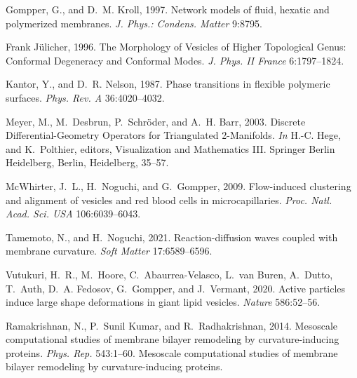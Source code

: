 \documentclass[twocolumn]{biophys-new}
\begin{document}
\begin{thebibliography}{52}
Gompper, G., and D.~M. Kroll, 1997.
\newblock Network models of fluid, hexatic and polymerized membranes.
\newblock \emph{J. Phys.: Condens. Matter} 9:8795.

{Frank J\"ulicher}, 1996.
\newblock The Morphology of Vesicles of Higher Topological Genus: Conformal
  Degeneracy and Conformal Modes.
\newblock \emph{J. Phys. II France} 6:1797--1824.

Kantor, Y., and D.~R. Nelson, 1987.
\newblock Phase transitions in flexible polymeric surfaces.
\newblock \emph{Phys. Rev. A} 36:4020--4032.

Meyer, M., M.~Desbrun, P.~Schr{\"o}der, and A.~H. Barr, 2003.
\newblock Discrete Differential-Geometry Operators for Triangulated
  2-Manifolds.
\newblock \emph{In} H.-C. Hege, and K.~Polthier, editors, Visualization and
  Mathematics III. Springer Berlin Heidelberg, Berlin, Heidelberg, 35--57.

McWhirter, J.~L., H.~Noguchi, and G.~Gompper, 2009.
\newblock Flow-induced clustering and alignment of vesicles and red blood cells
  in microcapillaries.
\newblock \emph{Proc. Natl. Acad. Sci. USA} 106:6039--6043.

Tamemoto, N., and H.~Noguchi, 2021.
\newblock Reaction-diffusion waves coupled with membrane curvature.
\newblock \emph{Soft Matter} 17:6589--6596.

Vutukuri, H.~R., M.~Hoore, C.~Abaurrea-Velasco, L.~van Buren, A.~Dutto,
  T.~Auth, D.~A. Fedosov, G.~Gompper, and J.~Vermant, 2020.
\newblock Active particles induce large shape deformations in giant lipid
  vesicles.
\newblock \emph{Nature} 586:52--56.

Ramakrishnan, N., P.~{Sunil Kumar}, and R.~Radhakrishnan, 2014.
\newblock Mesoscale computational studies of membrane bilayer remodeling by
  curvature-inducing proteins.
\newblock \emph{Phys. Rep.} 543:1--60.
\newblock Mesoscale computational studies of membrane bilayer remodeling by
  curvature-inducing proteins.


\end{thebibliography}
\end{document}
